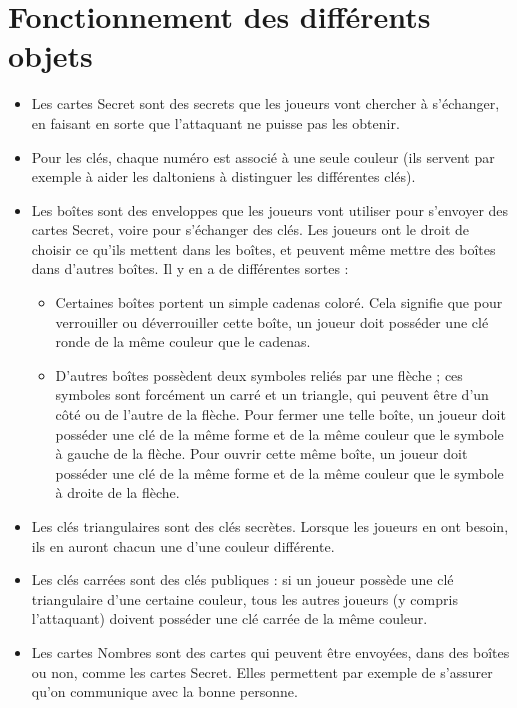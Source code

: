 \documentclass[a4paper,10pt]{article}
\begin{document}
\section{Fonctionnement des différents objets}
\begin{itemize}
	\item Les cartes Secret sont des secrets que les joueurs vont chercher à s'échanger, en faisant en sorte que l'attaquant ne puisse pas les obtenir.
	\item Pour les clés, chaque numéro est associé à une seule couleur (ils servent par exemple à aider les daltoniens à distinguer les différentes clés).
	\item Les boîtes sont des enveloppes que les joueurs vont utiliser pour s'envoyer des cartes Secret, voire pour s'échanger des clés. Les joueurs ont le droit de choisir ce qu'ils mettent dans les boîtes, et peuvent même mettre des boîtes dans d'autres boîtes. Il y en a de différentes sortes :
		\begin{itemize}
			\item Certaines boîtes portent un simple cadenas coloré. Cela signifie que pour verrouiller ou déverrouiller cette boîte, un joueur doit posséder une clé ronde de la même couleur que le cadenas.
			\item D'autres boîtes possèdent deux symboles reliés par une flèche ; ces symboles sont forcément un carré et un triangle, qui peuvent être d'un côté ou de l'autre de la flèche. Pour fermer une telle boîte, un joueur doit posséder une clé de la même forme et de la même couleur que le symbole à gauche de la flèche. Pour ouvrir cette même boîte, un joueur doit posséder une clé de la même forme et de la même couleur que le symbole à droite de la flèche. 
		\end{itemize}
	\item Les clés triangulaires sont des clés secrètes. Lorsque les joueurs en ont besoin, ils en auront chacun une d'une couleur différente.
	\item Les clés carrées sont des clés publiques : si un joueur possède une clé triangulaire d'une certaine couleur, tous les autres joueurs (y compris l'attaquant) doivent posséder une clé carrée de la même couleur.
	\item Les cartes Nombres sont des cartes qui peuvent être envoyées, dans des boîtes ou non, comme les cartes Secret. Elles permettent par exemple de s'assurer qu'on communique avec la bonne personne.
\end{itemize}
\end{document}
